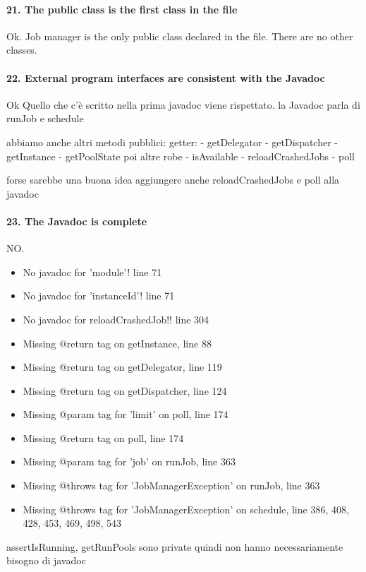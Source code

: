 \documentclass[english]{article}
\begin{document}
\paragraph{21. The public class is the first class in the file}
Ok.
Job manager is the only public class declared in the file.
There are no other classes.

\paragraph{22. External program interfaces are consistent with the Javadoc}
Ok
Quello che c'è scritto nella prima javadoc viene rispettato.
la Javadoc parla di runJob e schedule

abbiamo anche altri metodi pubblici:
getter:
- getDelegator
- getDispatcher
- getInstance
- getPoolState
poi altre robe
- isAvailable
- reloadCrashedJobs
- poll

forse sarebbe una buona idea aggiungere anche reloadCrashedJobs e poll alla javadoc

\paragraph{23. The Javadoc is complete}
NO.
\begin{itemize}
	\item No javadoc for 'module'! line 71
	\item No javadoc for 'instanceId'! line 71
	\item No javadoc for reloadCrashedJob!! line 304
	\item Missing @return tag on getInstance, line 88
	\item Missing @return tag on getDelegator, line 119
	\item Missing @return tag on getDispatcher, line 124
	\item Missing @param tag for 'limit' on poll, line 174
	\item Missing @return tag on poll, line 174
	\item Missing @param tag for 'job' on runJob, line 363
	\item Missing @throws tag for 'JobManagerException' on runJob, line 363
	\item Missing @throws tag for 'JobManagerException' on schedule, line 386, 408, 428, 453, 469, 498, 543
\end{itemize}

assertIsRunning, getRunPools sono private quindi non hanno necessariamente bisogno di javadoc
\end{document}
